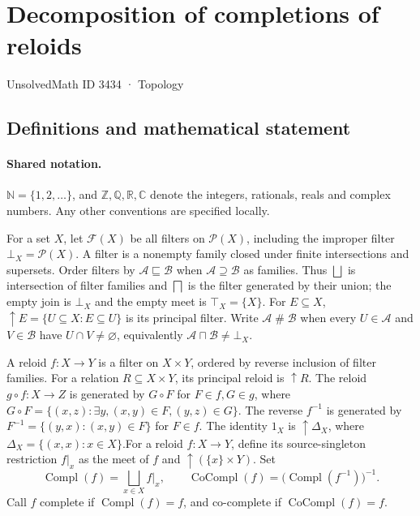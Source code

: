 \documentclass[11pt]{article}
\begin{document}
\setcounter{section}{3433}
\section{Decomposition of completions of reloids}\label{3434}
{\small\sffamily UnsolvedMath ID 3434 · Topology}
\subsection{Definitions and mathematical statement}

\paragraph{Shared notation.}$\mathbb N=\{1,2,\ldots\}$, and $\mathbb Z,\mathbb Q,\mathbb R,\mathbb C$ denote the integers, rationals, reals and complex numbers. Any other conventions are specified locally.


For a set $X$, let $\mathcal F(X)$ be all filters on $\mathcal P(X)$, including the improper filter $\bot_X=\mathcal P(X)$. A filter is a nonempty family closed under finite intersections and supersets. Order filters by $\mathcal A\sqsubseteq\mathcal B$ when $\mathcal A\supseteq\mathcal B$ as families. Thus $\bigsqcup$ is intersection of filter families and $\bigsqcap$ is the filter generated by their union; the empty join is $\bot_X$ and the empty meet is $\top_X=\{X\}$. For $E\subseteq X$, $\uparrow E=\{U\subseteq X:E\subseteq U\}$ is its principal filter. Write $\mathcal A\mathrel{\#}\mathcal B$ when every $U\in\mathcal A$ and $V\in\mathcal B$ have $U\cap V\ne\varnothing$, equivalently $\mathcal A\sqcap\mathcal B\ne\bot_X$.

A reloid $f:X\to Y$ is a filter on $X\times Y$, ordered by reverse inclusion of filter families. For a relation $R\subseteq X\times Y$, its principal reloid is $\uparrow R$. The reloid $g\circ f:X\to Z$ is generated by $G\circ F$ for $F\in f,G\in g$, where $G\circ F=\{(x,z):\exists y,(x,y)\in F,(y,z)\in G\}$. The reverse $f^{-1}$ is generated by $F^{-1}=\{(y,x):(x,y)\in F\}$ for $F\in f$. The identity $1_X$ is $\uparrow\Delta_X$, where $\Delta_X=\{(x,x):x\in X\}$.For a reloid $f:X\to Y$, define its source-singleton restriction $f|_x$ as the meet of $f$ and $\uparrow(\{x\}\times Y)$. Set
\[
 \operatorname{Compl}(f)=\bigsqcup_{x\in X}f|_x,
 \qquad \operatorname{CoCompl}(f)=\bigl(\operatorname{Compl}(f^{-1})\bigr)^{-1}.
\]
Call $f$ complete if $\operatorname{Compl}(f)=f$, and co-complete if $\operatorname{CoCompl}(f)=f$.
\end{document}
